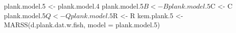 \begin{Schunk}
\begin{Sinput}
 plank.model.5 <- plank.model.4
 plank.model.5$B <- B
 plank.model.5$C <- C
 plank.model.5$Q <- Q
 plank.model.5$R <- R
 kem.plank.5 <- MARSS(d.plank.dat.w.fish, model = plank.model.5)
\end{Sinput}
\end{Schunk}
